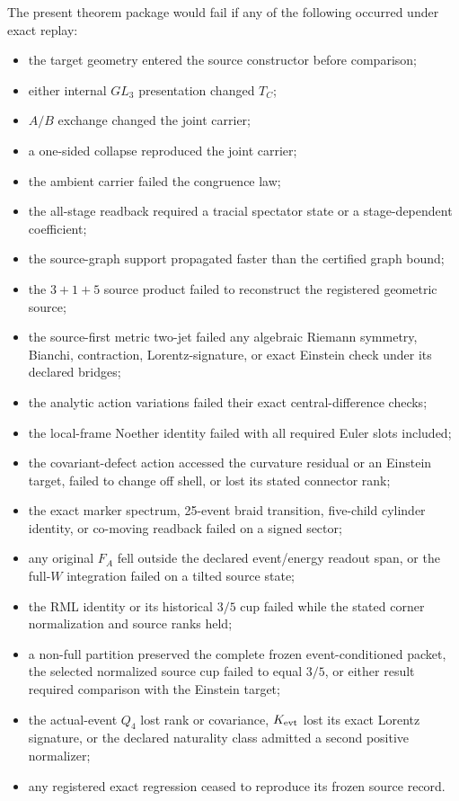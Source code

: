 \documentclass[11pt]{article}
\theoremstyle{definition}
\theoremstyle{remark}
\begin{document}
The present theorem package would fail if any of the following occurred under exact replay:
\begin{itemize}
\item the target geometry entered the source constructor before comparison;
\item either internal $GL_3$ presentation changed $T_C$;
\item $A/B$ exchange changed the joint carrier;
\item a one-sided collapse reproduced the joint carrier;
\item the ambient carrier failed the congruence law;
\item the all-stage readback required a tracial spectator state or a stage-dependent coefficient;
\item the source-graph support propagated faster than the certified graph bound;
\item the $3+1+5$ source product failed to reconstruct the registered geometric source;
\item the source-first metric two-jet failed any algebraic Riemann symmetry, Bianchi, contraction, Lorentz-signature, or exact Einstein check under its declared bridges;
\item the analytic action variations failed their exact central-difference checks;
\item the local-frame Noether identity failed with all required Euler slots included;
\item the covariant-defect action accessed the curvature residual or an Einstein target, failed to change off shell, or lost its stated connector rank;
\item the exact marker spectrum, 25-event braid transition, five-child cylinder identity, or co-moving readback failed on a signed sector;
\item any original $F_A$ fell outside the declared event/energy readout span, or the full-$W$ integration failed on a tilted source state;
\item the RML identity or its historical $3/5$ cup failed while the stated corner normalization and source ranks held;
\item a non-full partition preserved the complete frozen event-conditioned packet, the selected normalized source cup failed to equal $3/5$, or either result required comparison with the Einstein target;
\item the actual-event $Q_4$ lost rank or covariance, $K_{\rm evt}$ lost its exact Lorentz signature, or the declared naturality class admitted a second positive normalizer;
\item any registered exact regression ceased to reproduce its frozen source record.
\end{itemize}
\end{document}
